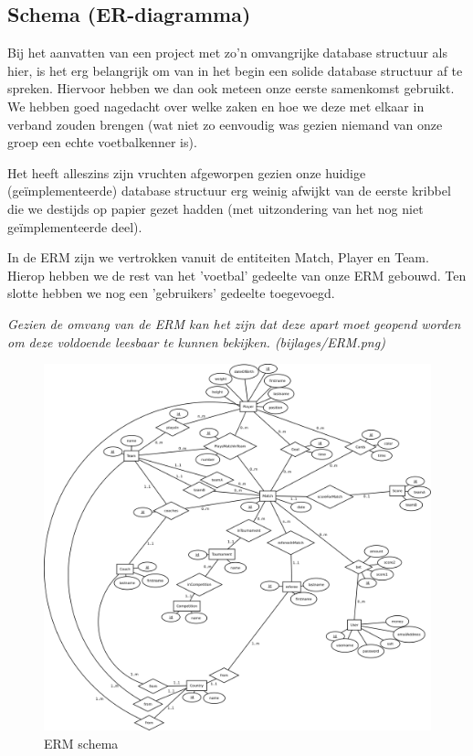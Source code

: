 \documentclass[11pt]{article}
\begin{document}
\subsection{Schema (ER-diagramma)}

Bij het aanvatten van een project met zo'n omvangrijke database structuur als hier, is het erg belangrijk om van in het begin een solide database structuur af te spreken.
Hiervoor hebben we dan ook meteen onze eerste samenkomst gebruikt.  We hebben goed nagedacht over welke zaken en hoe we deze met elkaar in verband zouden brengen (wat niet zo eenvoudig was gezien niemand van onze groep een echte voetbalkenner is).

Het heeft alleszins zijn vruchten afgeworpen gezien onze huidige (ge{\"i}mplementeerde) database structuur erg weinig afwijkt van de eerste kribbel die we destijds op papier gezet hadden (met uitzondering van het nog niet ge{\"i}mplementeerde deel).

In de ERM zijn we vertrokken vanuit de entiteiten Match, Player en Team.  Hierop hebben we de rest van het 'voetbal' gedeelte van onze ERM gebouwd.  Ten slotte hebben we nog een 'gebruikers' gedeelte toegevoegd.

\emph{Gezien de omvang van de ERM kan het zijn dat deze apart moet geopend worden om deze voldoende leesbaar te kunnen bekijken.  (bijlages/ERM.png)}


\begin{figure}[h!]
	\begin{center}
	\includegraphics[scale=0.11]{ERM.png}

	\caption{ERM schema}
	\label{fig:speler}
	\end{center}
\end{figure}
\end{document}
